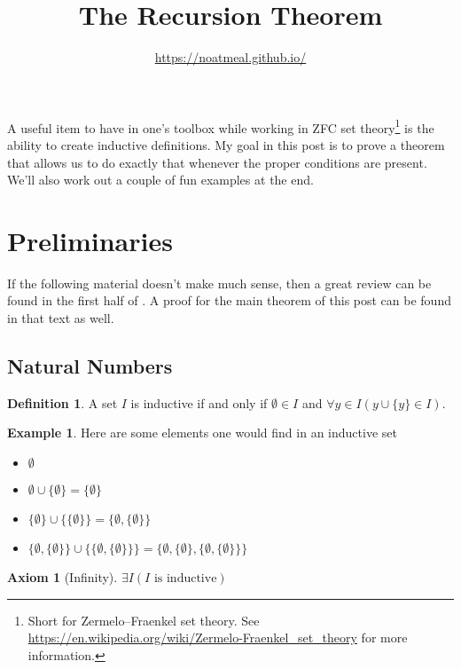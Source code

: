 \documentclass{article}
\title{The Recursion Theorem}
\author{\url{https://noatmeal.github.io/}}
\date{}
\theoremstyle{definition}
\newtheorem{definition}{Definition}[section]
\theoremstyle{definition}
\newtheorem{example}{Example}[section]
\theoremstyle{plain}
\theoremstyle{remark}
\theoremstyle{plain}
\theoremstyle{remark}
\theoremstyle{plain}
\theoremstyle{plain}
\theoremstyle{plain}
\newtheorem{axiom}{Axiom}[section]
\theoremstyle{plain}
\begin{document}
\maketitle

A useful item to have in one's toolbox while working in ZFC set 
theory\footnote{Short for Zermelo–Fraenkel set theory. See 
\url{https://en.wikipedia.org/wiki/Zermelo-Fraenkel_set_theory} for more 
information.} is the ability to create inductive definitions. My goal in this 
post is to prove a theorem that allows us to do exactly that whenever the 
proper conditions are present. We'll also work out a couple of fun examples at 
the end.

\section{Preliminaries}

If the following material doesn't make much sense, then a great review 
can be found in the first half of \cite{naiiveSet}. A proof for the main 
theorem of this post can be found in that text as well.

\subsection{Natural Numbers}

\begin{definition}
  A set \( I \) is inductive if and only if \( \emptyset \in I \) and 
  \( \forall y \in I (y \cup \{y\} \in I )\).
\end{definition}

\begin{example}
  Here are some elements one would find in an inductive set
  \begin{itemize}
    \item \( \emptyset \)
    \item \( \emptyset \cup \{\emptyset\} = \{\emptyset\}\)
    \item \( 
            \{\emptyset\} \cup \{\{\emptyset\}\} 
            = \{\emptyset, \{\emptyset\}\}
          \)
    \item \(
            \{\emptyset, \{\emptyset\}\} \cup \{ \{\emptyset, \{\emptyset\}\} \} 
            = 
            \{ \emptyset, \{\emptyset\}, \{\emptyset, \{ \emptyset \} \} \} 
          \)
  \end{itemize}
  \label{example:inductive_set}
\end{example}

\begin{axiom}[Infinity]
  \( \exists I ( I \text{ is inductive})\)
  \label{axiom:infinity}
\end{axiom}
\end{document}
